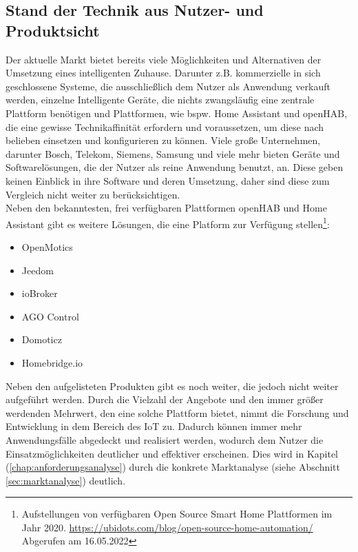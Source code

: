     \subsection{Stand der Technik aus Nutzer- und Produktsicht}
        Der aktuelle Markt bietet bereits viele Möglichkeiten und Alternativen der Umsetzung eines intelligenten Zuhause. 
        Darunter z.B. kommerzielle in sich geschlossene Systeme, die ausschließlich dem Nutzer als Anwendung verkauft werden, 
        einzelne Intelligente Geräte, die nichts zwangsläufig eine zentrale Plattform benötigen und Plattformen, wie bspw. 
        Home Assistant und openHAB, die eine gewisse Technikaffinität erfordern und voraussetzen, um diese nach belieben 
        einsetzen und konfigurieren zu können. Viele große Unternehmen, darunter Bosch, Telekom, Siemens, Samsung und viele mehr bieten Geräte 
        und Softwarelösungen, die der Nutzer als reine Anwendung benutzt, an. Diese geben keinen Einblick in ihre Software 
        und deren Umsetzung, daher sind diese zum Vergleich nicht weiter zu berücksichtigen. 
        \\
        \linebreak
        Neben den bekanntesten, frei verfügbaren Plattformen openHAB und Home Assistant gibt es weitere Lösungen, die eine 
        Platform zur Verfügung stellen\footnote{Aufstellungen von verfügbaren Open Source Smart Home Plattformen im Jahr 2020. \url{https://ubidots.com/blog/open-source-home-automation/} Abgerufen am 16.05.2022}:
        \begin{itemize}
            \item OpenMotics
            \item Jeedom
            \item ioBroker
            \item AGO Control 
            \item Domoticz
            \item Homebridge.io
        \end{itemize}
        Neben den aufgelisteten Produkten gibt es noch weiter, die jedoch nicht weiter aufgeführt werden. 
        Durch die Vielzahl der Angebote und den immer größer werdenden Mehrwert, den eine solche Plattform bietet, 
        nimmt die Forschung und Entwicklung in dem Bereich des \acs{IoT} zu. Dadurch können immer mehr 
        Anwendungsfälle abgedeckt und realisiert werden, wodurch dem Nutzer die Einsatzmöglichkeiten deutlicher 
        und effektiver erscheinen. 
        Dies wird in Kapitel 
        (\ref{chap:anforderungsanalyse}) durch die konkrete Marktanalyse (siehe Abschnitt \ref{sec:marktanalyse}) deutlich. 
